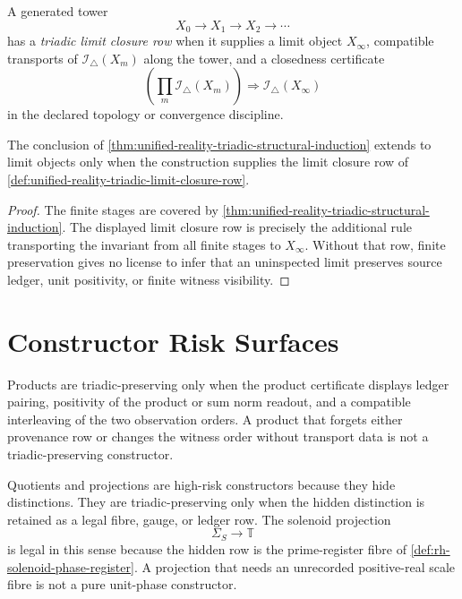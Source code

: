 \begin{definition}
\label{def:unified-reality-triadic-limit-closure-row}
A generated tower
$$
X_0\to X_1\to X_2\to\cdots
$$
has a \emph{triadic limit closure row} when it supplies a limit object
$X_{\infty}$, compatible transports of
$\mathcal I_{\triangle}(X_m)$ along the tower, and a closedness
certificate
$$
\left(
\prod_m\mathcal I_{\triangle}(X_m)
\right)
\Longrightarrow
\mathcal I_{\triangle}(X_{\infty})
$$
in the declared topology or convergence discipline.
\end{definition}

\begin{theorem}
\label{thm:unified-reality-triadic-induction-certified-limits}
The conclusion of
\autoref{thm:unified-reality-triadic-structural-induction} extends to
limit objects only when the construction supplies the limit closure row
of \autoref{def:unified-reality-triadic-limit-closure-row}.
\end{theorem}

\begin{proof}
The finite stages are covered by
\autoref{thm:unified-reality-triadic-structural-induction}. The displayed
limit closure row is precisely the additional rule transporting the
invariant from all finite stages to $X_{\infty}$. Without that row,
finite preservation gives no license to infer that an uninspected limit
preserves source ledger, unit positivity, or finite witness visibility.
\end{proof}

\section{Constructor Risk Surfaces}
\label{sec:unified-reality-triadic-constructor-risk-surfaces}

\begin{principle}
\label{prin:unified-reality-triadic-product-preservation}
Products are triadic-preserving only when the product certificate
displays ledger pairing, positivity of the product or sum norm readout,
and a compatible interleaving of the two observation orders. A product
that forgets either provenance row or changes the witness order without
transport data is not a triadic-preserving constructor.
\end{principle}

\begin{principle}
\label{prin:unified-reality-triadic-quotient-preservation}
Quotients and projections are high-risk constructors because they hide
distinctions. They are triadic-preserving only when the hidden
distinction is retained as a legal fibre, gauge, or ledger row. The
solenoid projection
$$
\Sigma_S\to\mathbb T
$$
is legal in this sense because the hidden row is the prime-register
fibre of \autoref{def:rh-solenoid-phase-register}. A projection that
needs an unrecorded positive-real scale fibre is not a pure unit-phase
constructor.
\end{principle}

